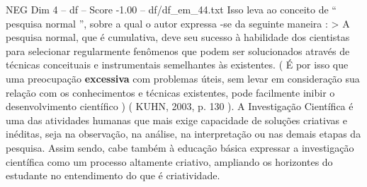 \begin{textsample}{NEG Dim 4 – df – Score -1.00 – df/df\_em\_44.txt}
Isso leva ao conceito de “ pesquisa normal ”, sobre a qual o autor expressa -se da seguinte maneira : > A pesquisa normal, que é cumulativa, deve seu sucesso à habilidade dos cientistas para selecionar regularmente fenômenos que podem ser solucionados através de técnicas conceituais e instrumentais semelhantes às existentes. ( É por isso que uma preocupação \textbf{excessiva} com problemas úteis, sem levar em consideração sua relação com os conhecimentos e técnicas existentes, pode facilmente inibir o desenvolvimento científico ) ( KUHN, 2003, p. 130 ).
A Investigação Científica é uma das atividades humanas que mais exige capacidade de soluções criativas e inéditas, seja na observação, na análise, na interpretação ou nas demais etapas da pesquisa.
Assim sendo, cabe também à educação básica expressar a investigação científica como um processo altamente criativo, ampliando os horizontes do estudante no entendimento do que é criatividade.

\end{textsample}
